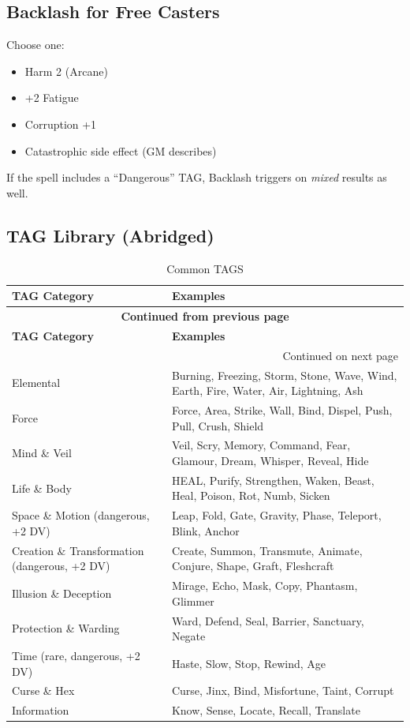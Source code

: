 \subsection{Backlash for Free Casters}
Choose one:
\begin{itemize}
    \item Harm 2 (Arcane)
    \item +2 Fatigue
    \item Corruption +1
    \item Catastrophic side effect (GM describes)
\end{itemize}
If the spell includes a ``Dangerous'' TAG, Backlash triggers on \emph{mixed} results as well.

\subsection{TAG Library (Abridged)}\label{subsec:tag_library}

\centering
\small
\begin{longtable}{p{3.5cm} p{10cm}}
\caption{Common TAGS}\label{tab:tags_abridged}\\
\toprule
\textbf{TAG Category} & \textbf{Examples} \\
\midrule
\endfirsthead
\multicolumn{2}{c}{{\bfseries Continued from previous page}} \\
\toprule
\textbf{TAG Category} & \textbf{Examples} \\
\midrule
\endhead
\midrule
\multicolumn{2}{r}{{Continued on next page}} \\
\endfoot
\bottomrule
\endlastfoot
Elemental & Burning, Freezing, Storm, Stone, Wave, Wind, Earth, Fire, Water, Air, Lightning, Ash \\
Force & Force, Area, Strike, Wall, Bind, Dispel, Push, Pull, Crush, Shield \\
Mind \& Veil & Veil, Scry, Memory, Command, Fear, Glamour, Dream, Whisper, Reveal, Hide \\
Life \& Body & HEAL, Purify, Strengthen, Waken, Beast, Heal, Poison, Rot, Numb, Sicken \\
Space \& Motion (dangerous, +2 DV) & Leap, Fold, Gate, Gravity, Phase, Teleport, Blink, Anchor \\
Creation \& Transformation (dangerous, +2 DV) & Create, Summon, Transmute, Animate, Conjure, Shape, Graft, Fleshcraft \\
Illusion \& Deception & Mirage, Echo, Mask, Copy, Phantasm, Glimmer \\
Protection \& Warding & Ward, Defend, Seal, Barrier, Sanctuary, Negate \\
Time (rare, dangerous, +2 DV) & Haste, Slow, Stop, Rewind, Age \\
Curse \& Hex & Curse, Jinx, Bind, Misfortune, Taint, Corrupt \\
Information & Know, Sense, Locate, Recall, Translate \\
\end{longtable}
\par

